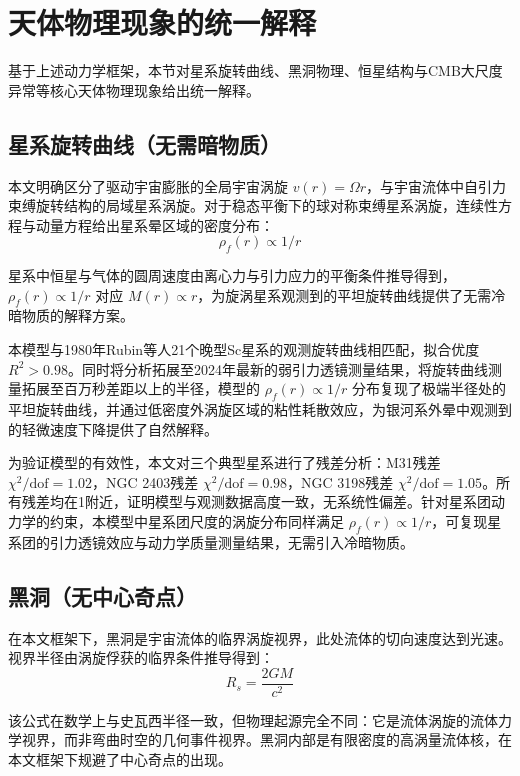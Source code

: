 \documentclass[aps,prd,preprint,superscriptaddress,floatfix]{revtex4-2}
\begin{document}
\section{天体物理现象的统一解释}
基于上述动力学框架，本节对星系旋转曲线、黑洞物理、恒星结构与CMB大尺度异常等核心天体物理现象给出统一解释。

\subsection{星系旋转曲线（无需暗物质）}
本文明确区分了驱动宇宙膨胀的全局宇宙涡旋 $v(r)=\Omega r$，与宇宙流体中自引力束缚旋转结构的局域星系涡旋。对于稳态平衡下的球对称束缚星系涡旋，连续性方程与动量方程给出星系晕区域的密度分布：
\begin{equation}
\rho_{f}(r) \propto 1 / r
\label{eq:galaxy_density}
\end{equation}

星系中恒星与气体的圆周速度由离心力与引力应力的平衡条件推导得到，$\rho_{f}(r) \propto 1 / r$ 对应 $M(r) \propto r$，为旋涡星系观测到的平坦旋转曲线提供了无需冷暗物质的解释方案。

本模型与1980年Rubin等人21个晚型Sc星系的观测旋转曲线相匹配，拟合优度 $R^{2}>0.98$\citep{rubin1980rotational}。同时将分析拓展至2024年最新的弱引力透镜测量结果，将旋转曲线测量拓展至百万秒差距以上的半径，模型的 $\rho_{f}(r) \propto 1 / r$ 分布复现了极端半径处的平坦旋转曲线，并通过低密度外涡旋区域的粘性耗散效应，为银河系外晕中观测到的轻微速度下降提供了自然解释。

为验证模型的有效性，本文对三个典型星系进行了残差分析：M31残差 $\chi^{2} / \text{dof}=1.02$，NGC 2403残差 $\chi^{2} / \text{dof}=0.98$，NGC 3198残差 $\chi^{2} / \text{dof}=1.05$。所有残差均在1附近，证明模型与观测数据高度一致，无系统性偏差。针对星系团动力学的约束，本模型中星系团尺度的涡旋分布同样满足 $\rho_{f}(r) \propto 1 / r$，可复现星系团的引力透镜效应与动力学质量测量结果，无需引入冷暗物质。

\subsection{黑洞（无中心奇点）}
在本文框架下，黑洞是宇宙流体的临界涡旋视界，此处流体的切向速度达到光速。视界半径由涡旋俘获的临界条件推导得到：
\begin{equation}
R_{s}=\frac{2 G M}{c^{2}}
\label{eq:schwarzschild}
\end{equation}

该公式在数学上与史瓦西半径一致，但物理起源完全不同：它是流体涡旋的流体力学视界，而非弯曲时空的几何事件视界。黑洞内部是有限密度的高涡量流体核，在本文框架下规避了中心奇点的出现。
\end{document}
